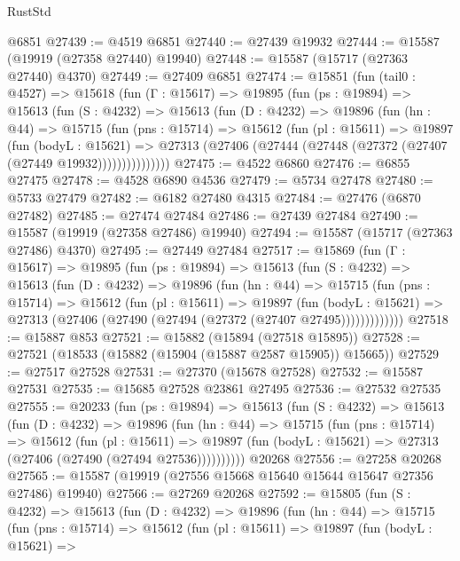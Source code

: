 \begin{lexlean}{RustStd}
\begin{coremodule}
    @6851
@27439 := @4519 @6851
@27440 := @27439 @19932
@27444 := @15587 (@19919 (@27358 @27440) @19940)
@27448 := @15587 (@15717 (@27363 @27440) @4370)
@27449 := @27409 @6851
@27474 := @15851
    (fun (tail0 : @4527) =>
    @15618
      (fun (Γ : @15617) =>
      @19895
        (fun (ps : @19894) =>
        @15613
          (fun (S : @4232) =>
          @15613
            (fun (D : @4232) =>
            @19896
              (fun (hn : @44) =>
              @15715
                (fun (pns : @15714) =>
                @15612
                  (fun (pl : @15611) =>
                  @19897
                    (fun (bodyL : @15621) =>
                    @27313 (@27406 (@27444 (@27448 (@27372 (@27407 (@27449 @19932)))))))))))))))
@27475 := @4522 @6860
@27476 := @6855 @27475
@27478 := @4528 @6890 @4536
@27479 := @5734 @27478
@27480 := @5733 @27479
@27482 := @6182 @27480 @4315
@27484 := @27476 (@6870 @27482)
@27485 := @27474 @27484
@27486 := @27439 @27484
@27490 := @15587 (@19919 (@27358 @27486) @19940)
@27494 := @15587 (@15717 (@27363 @27486) @4370)
@27495 := @27449 @27484
@27517 := @15869
    (fun (Γ : @15617) =>
    @19895
      (fun (ps : @19894) =>
      @15613
        (fun (S : @4232) =>
        @15613
          (fun (D : @4232) =>
          @19896
            (fun (hn : @44) =>
            @15715
              (fun (pns : @15714) =>
              @15612
                (fun (pl : @15611) =>
                @19897
                  (fun (bodyL : @15621) =>
                  @27313 (@27406 (@27490 (@27494 (@27372 (@27407 @27495)))))))))))))
@27518 := @15887 @853
@27521 := @15882 (@15894 (@27518 @15895))
@27528 := @27521 (@18533 (@15882 (@15904 (@15887 @2587 @15905)) @15665))
@27529 := @27517 @27528
@27531 := @27370 (@15678 @27528)
@27532 := @15587 @27531
@27535 := @15685 @27528 @23861 @27495
@27536 := @27532 @27535
@27555 := @20233
    (fun (ps : @19894) =>
    @15613
      (fun (S : @4232) =>
      @15613
        (fun (D : @4232) =>
        @19896
          (fun (hn : @44) =>
          @15715
            (fun (pns : @15714) =>
            @15612
              (fun (pl : @15611) =>
              @19897 (fun (bodyL : @15621) => @27313 (@27406 (@27490 (@27494 @27536))))))))))
    @20268
@27556 := @27258 @20268
@27565 := @15587 (@19919 (@27556 @15668 @15640 @15644 @15647 @27356 @27486) @19940)
@27566 := @27269 @20268
@27592 := @15805
    (fun (S : @4232) =>
    @15613
      (fun (D : @4232) =>
      @19896
        (fun (hn : @44) =>
        @15715
          (fun (pns : @15714) =>
          @15612
            (fun (pl : @15611) =>
            @19897
              (fun (bodyL : @15621) =>

\end{coremodule}
\end{lexlean}
